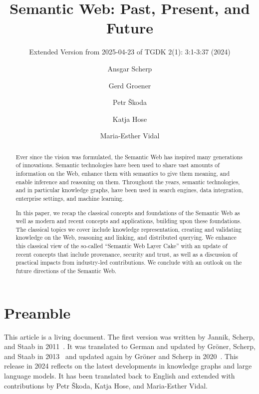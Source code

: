 \documentclass[a4paper,USenglish]{tgdk-v2021}
\author{Ansgar Scherp}{Ulm University, Germany \and \url{http://ansgarscherp.net}}{ansgar.scherp@uni-ulm.de}{https://orcid.org/0000-0002-2653-9245}{}
\author{Gerd Groener}{Carl Zeiss SMT GmbH, Germany \and
\url{http://www.gerd-groener.de}}{gerd.groener@gmx.de}{https://orcid.org/0009-0002-0259-9769}{}{}
\author{Petr \v{S}koda}{Department of Software Engineering, Faculty of Mathematics and Physics, Charles University, Prague, Czechia}{petr.skoda@matfyz.cuni.cz}{https://orcid.org/0000-0002-2732-9370}{}
\author{Katja Hose}{TU Wien, Austria \and \url{http://www.katja-hose.de}}{katja.hose@tuwien.ac.at} {https://orcid.org/0000-0001-7025-8099}{}
\author{Maria-Esther Vidal}{Leibniz University of Hannover and TIB-Leibniz Information Centre for Science and Technology, Germany}{maria.vidal@tib.eu}{https://orcid.org/0000-0003-1160-8727}{Partially funded by Leibniz Association, program "Leibniz Best Minds: Programme for Women Professors", project TrustKG-Transforming Data in Trustable Insights; Grant P99/2020}
\begin{document}
\title{Semantic Web: Past, Present, and Future}
\subtitle{Extended Version from 2025-04-23 of TGDK 2(1): 3:1-3:37 (2024)}
\maketitle


\begin{abstract}

Ever since the vision was formulated, the Semantic Web has inspired many generations of innovations.
Semantic technologies have been used to share vast amounts of information on the Web, enhance them with semantics to give them meaning, and enable inference and reasoning on them. 
Throughout the years, semantic technologies, and in particular knowledge graphs, have been used in search engines, data integration, enterprise settings, and machine learning.

In this paper, we recap the classical concepts and foundations of the Semantic Web as well as modern and recent concepts and applications, building upon these foundations. 
The classical topics we cover include knowledge representation, creating and validating knowledge on the Web, reasoning and linking, and distributed querying.
We enhance this classical view of the so-called ``Semantic Web Layer Cake'' with an update of recent concepts that include provenance, security and trust, as well as a discussion of practical impacts from industry-led contributions.
We conclude with an outlook on the future directions of the Semantic Web.

\end{abstract}

\clearpage

\section*{Preamble}

This article is a living document.
The first version was written by Jannik, Scherp, and Staab in 2011~\cite{DBLP:journals/insk/JanikSS11}.
It was translated to German and updated by Gröner, Scherp, and Staab in 2013~\cite{DBLP:books/ol/13/GronerSS13} and updated again by Gröner and Scherp in 2020~\cite{DBLP:books/degruyter/20/ScherpG20}.
This release in 2024 reflects on the latest developments in knowledge graphs and large language models.
It has been translated back to English and extended with contributions by Petr \v{S}koda, Katja Hose, and Maria-Esther Vidal.	
\end{document}
